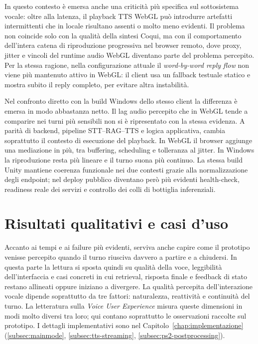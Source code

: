 In questo contesto è emersa anche una criticità più specifica sul sottosistema vocale: oltre alla latenza, il playback TTS WebGL può introdurre artefatti intermittenti che in locale risultano assenti o molto meno evidenti. Il problema non coincide solo con la qualità della sintesi Coqui, ma con il comportamento dell'intera catena di riproduzione progressiva nel browser remoto, dove proxy, jitter e vincoli del runtime audio WebGL diventano parte del problema percepito. Per la stessa ragione, nella configurazione attuale il \emph{word-by-word reply flow} non viene più mantenuto attivo in WebGL: il client usa un fallback testuale statico e mostra subito il reply completo, per evitare altra instabilità.

Nel confronto diretto con la build Windows dello stesso client la differenza è emersa in modo abbastanza netto. Il lag audio percepito che in WebGL tende a comparire nei turni più sensibili non si è ripresentato con la stessa evidenza. A parità di backend, pipeline STT--RAG--TTS e logica applicativa, cambia soprattutto il contesto di esecuzione del playback. In WebGL il browser aggiunge una mediazione in più, tra buffering, scheduling e tolleranza al jitter. In Windows la riproduzione resta più lineare e il turno suona più continuo. La stessa build Unity mantiene coerenza funzionale nei due contesti grazie alla normalizzazione degli endpoint; nel deploy pubblico diventano però più evidenti health-check, readiness reale dei servizi e controllo dei colli di bottiglia inferenziali.

\section{Risultati qualitativi e casi d'uso}
\label{sec:qualitativi}
\noindent Accanto ai tempi e ai failure più evidenti, serviva anche capire come il prototipo venisse percepito quando il turno riusciva davvero a partire e a chiudersi. In questa parte la lettura si sposta quindi su qualità della voce, leggibilità dell'interfaccia e casi concreti in cui retrieval, risposta finale e feedback di stato restano allineati oppure iniziano a divergere. La qualità percepita dell'interazione vocale dipende soprattutto da tre fattori: naturalezza, reattività e continuità del turno. La letteratura sulla \emph{Voice User Experience} misura queste dimensioni in modi molto diversi tra loro; qui contano soprattutto le osservazioni raccolte sul prototipo.\cite{seaborn2021voiceux} I dettagli implementativi sono nel Capitolo~\ref{chap:implementazione} (\autoref{subsec:mainmode}, \autoref{subsec:tts-streaming}, \autoref{subsec:ps2-postprocessing}).

